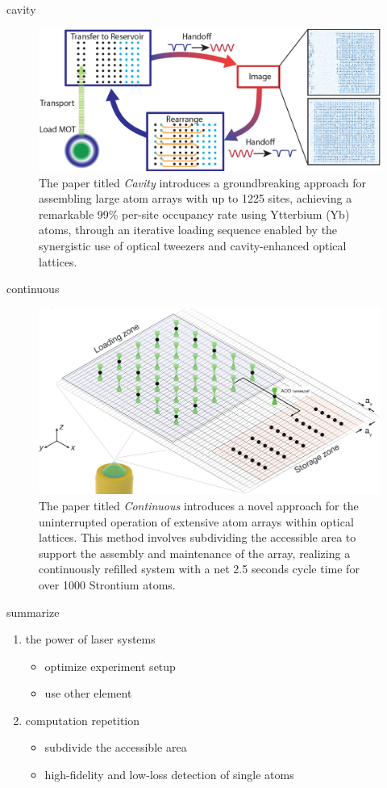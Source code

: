 \documentclass[18 pt]{beamer}
\begin{document}
\begin{frame}{cavity}
\begin{figure}
  \includegraphics[width=\textwidth]{IMG/cavity.png}
  \caption{The paper titled \textit{Cavity} introduces a groundbreaking approach for assembling large atom arrays with up to 1225 sites, achieving a remarkable 99\% per-site occupancy rate using Ytterbium (Yb) atoms, through an iterative loading sequence enabled by the synergistic use of optical tweezers and cavity-enhanced optical lattices.}
\end{figure}
\end{frame}
\begin{frame}{continuous}
  \begin{figure}
    \includegraphics[width=.8\textwidth]{IMG/continus.png}
    \caption{The paper titled \textit{Continuous} introduces a novel approach for the uninterrupted operation of extensive atom arrays within optical lattices. This method involves subdividing the accessible area to support the assembly and maintenance of the array, realizing a continuously refilled system with a net 2.5 seconds cycle time for over 1000 Strontium atoms.}
  \end{figure}
\end{frame}
\begin{frame}{summarize}
  \begin{enumerate}
    \item the power of laser systems
    \begin{itemize}
      \item optimize experiment setup
      \item use other element
    \end{itemize}
    \item computation repetition
    \begin{itemize}
      \item subdivide the accessible area
      \item high-fidelity and low-loss detection of single atoms
    \end{itemize} 
  \end{enumerate}
\end{frame}
\end{document}
